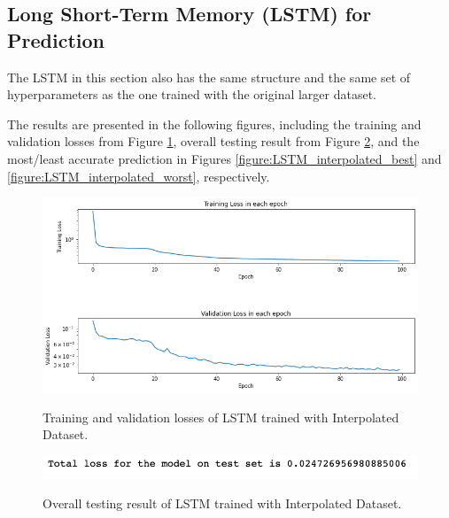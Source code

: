 \subsection{Long Short-Term Memory (LSTM) for Prediction}

The LSTM in this section also has the same structure and the same set of hyperparameters as the one trained with the original larger dataset.

The results are presented in the following figures, including the training and validation losses from Figure \ref{figure:LSTM_interpolated_losses}, overall testing result from Figure \ref{figure:LSTM_interpolated_testing}, and the most/least accurate prediction in Figures \ref{figure:LSTM_interpolated_best} and \ref{figure:LSTM_interpolated_worst}, respectively.


\begin{figure}[H]
    \caption{Training and validation losses of LSTM trained with Interpolated Dataset.}
    \includegraphics[scale=0.6]{figures/mantle_convection_images/larger_dataset_interpolated/LSTM_trainingData.png}
    \label{figure:LSTM_interpolated_losses}
\end{figure}

\begin{figure}[H]
    \caption{Overall testing result of LSTM trained with Interpolated Dataset.}
    \includegraphics[scale=0.8]{figures/mantle_convection_images/larger_dataset_interpolated/LSTM_OverallTesting.png}
    \label{figure:LSTM_interpolated_testing}
\end{figure}

